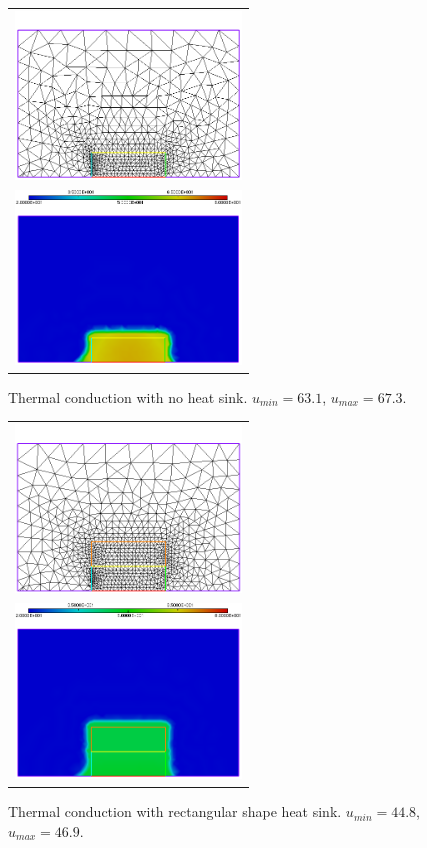 \begin{figure}[http]
	\centering
	\begin{tabular}{c}
		\includegraphics[width=6cm]{figures/nosinkc} \\ \includegraphics[width=6cm]{figures/nosinkb}
	\end{tabular}
	\caption{Thermal conduction with no heat sink. $u_{min}=63.1$, $u_{max}=67.3$.}
\end{figure}
\begin{figure}[http]
	\centering
	\begin{tabular}{c}
		\includegraphics[width=6cm]{figures/recsinkc} \\ \includegraphics[width=6cm]{figures/recsinkb}
	\end{tabular}
	\caption{Thermal conduction with rectangular shape heat sink. $u_{min}=44.8$, $u_{max}=46.9$.}
\end{figure}
